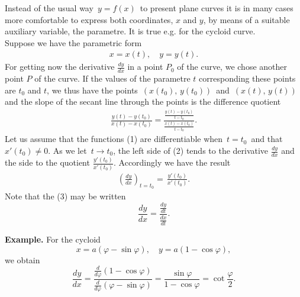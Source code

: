 \documentclass[12pt]{article}
\theoremstyle{definition}
\begin{document}
Instead of the usual way\, $y = f(x)$\, to present plane curves it is in many cases more comfortable to express both coordinates, $x$ and $y$, by means of a suitable auxiliary variable, the parametre.  It is true e.g. for the cycloid curve.\\

Suppose we have the parametric form
\begin{align}
x = x(t),\quad y = y(t).
\end{align}
For getting now the derivative $\displaystyle\frac{dy}{dx}$ in a point $P_0$ of the curve, we chose another point $P$ of the curve.  If the values of the parametre $t$ corresponding these points are $t_0$ and $t$, we thus have the points\, $(x(t_0),\,y(t_0))$\, and\, $(x(t),\,y(t))$\, and the slope of the secant line through the points is the difference quotient
\begin{align}
\frac{y(t)-y(t_0)}{x(t)-x(t_0)} = \frac{\frac{y(t)-y(t_0)}{t-t_0}}{\frac{x(t)-x(t_0)}{t-t_0}}.
\end{align}
Let us assume that the functions (1) are differentiable when\, $t = t_0$\, and that\, $x'(t_0) \neq 0$.  As we let\, $t\to t_0$, the left side of (2) tends to the derivative $\frac{dy}{dx}$ and the  side to the quotient $\frac{y'(t_0)}{x'(t_0)}$.  Accordingly we have the result
\begin{align}
\left(\frac{dy}{dx}\right)_{\!t=t_0} =\, \frac{y'(t_0)}{x'(t_0)}.
\end{align}
Note that the  (3)
may be written
$$\frac{dy}{dx} = \frac{\frac{dy}{dt}}{\frac{dx}{dt}}.$$

\textbf{Example.}  For the cycloid
  $$x = a(\varphi-\sin{\varphi}),\quad y = a(1-\cos{\varphi}),$$
we obtain
$$\frac{dy}{dx} = \frac{\frac{d}{d\varphi}(1-\cos\varphi)}{\frac{d}{d\varphi}(\varphi-\sin\varphi)} 
= \frac{\sin\varphi}{1-\cos\varphi} = \cot\frac{\varphi}{2}.$$ 


\end{document}
